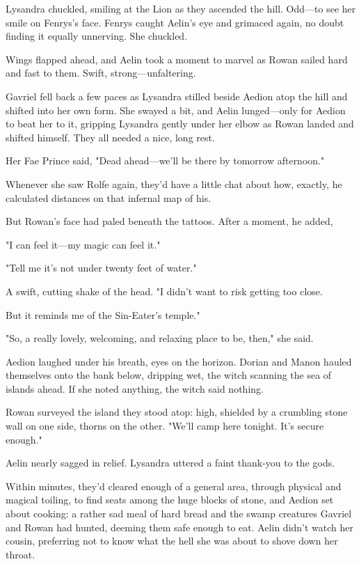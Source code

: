 Lysandra chuckled, smiling at the Lion as they ascended the hill. Odd---to see her smile on Fenrys's face. Fenrys caught Aelin's eye and grimaced again, no doubt finding it equally unnerving. She chuckled.

Wings flapped ahead, and Aelin took a moment to marvel as Rowan sailed hard and fast to them. Swift, strong---unfaltering.

Gavriel fell back a few paces as Lysandra stilled beside Aedion atop the hill and shifted into her own form. She swayed a bit, and Aelin lunged---only for Aedion to beat her to it, gripping Lysandra gently under her elbow as Rowan landed and shifted himself. They all needed a nice, long rest.

Her Fae Prince said, "Dead ahead---we'll be there by tomorrow afternoon."

Whenever she saw Rolfe again, they'd have a little chat about how, exactly, he calculated distances on that infernal map of his.

But Rowan's face had paled beneath the tattoos. After a moment, he added,

"I can feel it---my magic can feel it."

"Tell me it's not under twenty feet of water."

A swift, cutting shake of the head. "I didn't want to risk getting too close.

But it reminds me of the Sin-Eater's temple."

"So, a really lovely, welcoming, and relaxing place to be, then," she said.

Aedion laughed under his breath, eyes on the horizon. Dorian and Manon hauled themselves onto the bank below, dripping wet, the witch scanning the sea of islands ahead. If she noted anything, the witch said nothing.

Rowan surveyed the island they stood atop: high, shielded by a crumbling stone wall on one side, thorns on the other. "We'll camp here tonight. It's secure enough."

Aelin nearly sagged in relief. Lysandra uttered a faint thank-you to the gods.

Within minutes, they'd cleared enough of a general area, through physical and magical toiling, to find seats among the huge blocks of stone, and Aedion set about cooking: a rather sad meal of hard bread and the swamp creatures Gavriel and Rowan had hunted, deeming them safe enough to eat. Aelin didn't watch her cousin, preferring not to know what the hell she was about to shove down her throat.


